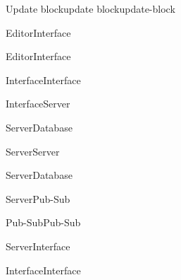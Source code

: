\begin{toexclude}
\begin{sdfig}{Update block}{update block}{update-block}

  \begin{seqdigauth}[Editor]
    \begin{umlcall}[op={Update block},return={Select type}]{Editor}{Interface}
    \end{umlcall}

    \begin{umlcall}[op={Update block}]{Editor}{Interface}
      \begin{umlcall}[op={Update local state}]{Interface}{Interface}
      \end{umlcall}
      \begin{umlcall}[op={Update block}]{Interface}{Server}
        \begin{umlcall}[op={Get block}]{Server}{Database}
          \begin{umlcall}[op={Compare versions}]{Server}{Server}
            \begin{umlfragment}[type=alt, label=equal]
              \begin{umlcall}[op={Update block}]{Server}{Database}
                \begin{umlcall}[op={Propagate change}]{Server}{Pub-Sub}
                  \begin{umlcall}[op={Propagate}]{Pub-Sub}{Pub-Sub}
                  \end{umlcall}
                \end{umlcall}
              \end{umlcall}
              \umlfpart[else]
              \begin{umlcall}[op={Refuse change},type=return]{Server}{Interface}
                \begin{umlcall}[op={Update local state}]{Interface}{Interface}
                \end{umlcall}
              \end{umlcall}
            \end{umlfragment}
          \end{umlcall}
        \end{umlcall}
      \end{umlcall}
    \end{umlcall}
  \end{seqdigauth}
\end{sdfig}


\end{toexclude}
